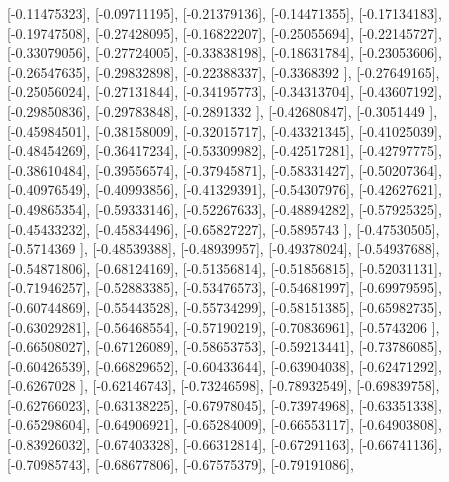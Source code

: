 \documentclass{article}
\begin{document}
       [-0.11475323],
       [-0.09711195],
       [-0.21379136],
       [-0.14471355],
       [-0.17134183],
       [-0.19747508],
       [-0.27428095],
       [-0.16822207],
       [-0.25055694],
       [-0.22145727],
       [-0.33079056],
       [-0.27724005],
       [-0.33838198],
       [-0.18631784],
       [-0.23053606],
       [-0.26547635],
       [-0.29832898],
       [-0.22388337],
       [-0.3368392 ],
       [-0.27649165],
       [-0.25056024],
       [-0.27131844],
       [-0.34195773],
       [-0.34313704],
       [-0.43607192],
       [-0.29850836],
       [-0.29783848],
       [-0.2891332 ],
       [-0.42680847],
       [-0.3051449 ],
       [-0.45984501],
       [-0.38158009],
       [-0.32015717],
       [-0.43321345],
       [-0.41025039],
       [-0.48454269],
       [-0.36417234],
       [-0.53309982],
       [-0.42517281],
       [-0.42797775],
       [-0.38610484],
       [-0.39556574],
       [-0.37945871],
       [-0.58331427],
       [-0.50207364],
       [-0.40976549],
       [-0.40993856],
       [-0.41329391],
       [-0.54307976],
       [-0.42627621],
       [-0.49865354],
       [-0.59333146],
       [-0.52267633],
       [-0.48894282],
       [-0.57925325],
       [-0.45433232],
       [-0.45834496],
       [-0.65827227],
       [-0.5895743 ],
       [-0.47530505],
       [-0.5714369 ],
       [-0.48539388],
       [-0.48939957],
       [-0.49378024],
       [-0.54937688],
       [-0.54871806],
       [-0.68124169],
       [-0.51356814],
       [-0.51856815],
       [-0.52031131],
       [-0.71946257],
       [-0.52883385],
       [-0.53476573],
       [-0.54681997],
       [-0.69979595],
       [-0.60744869],
       [-0.55443528],
       [-0.55734299],
       [-0.58151385],
       [-0.65982735],
       [-0.63029281],
       [-0.56468554],
       [-0.57190219],
       [-0.70836961],
       [-0.5743206 ],
       [-0.66508027],
       [-0.67126089],
       [-0.58653753],
       [-0.59213441],
       [-0.73786085],
       [-0.60426539],
       [-0.66829652],
       [-0.60433644],
       [-0.63904038],
       [-0.62471292],
       [-0.6267028 ],
       [-0.62146743],
       [-0.73246598],
       [-0.78932549],
       [-0.69839758],
       [-0.62766023],
       [-0.63138225],
       [-0.67978045],
       [-0.73974968],
       [-0.63351338],
       [-0.65298604],
       [-0.64906921],
       [-0.65284009],
       [-0.66553117],
       [-0.64903808],
       [-0.83926032],
       [-0.67403328],
       [-0.66312814],
       [-0.67291163],
       [-0.66741136],
       [-0.70985743],
       [-0.68677806],
       [-0.67575379],
       [-0.79191086],
\end{document}
